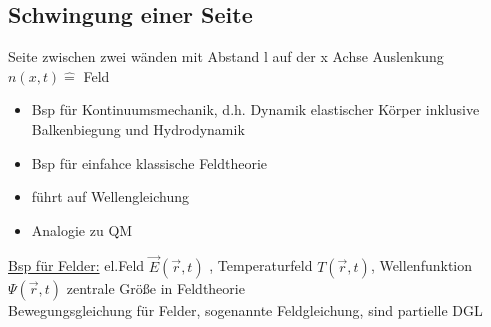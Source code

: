\documentclass[titlepage,12pt,a4paper,ngerman]{report}
\begin{document}
\subsection{Schwingung einer Seite}
Seite zwischen zwei wänden mit Abstand l auf der x Achse
Auslenkung $ n(x,t) \widehat{=} $ Feld
\begin{itemize}
	\item Bsp für Kontinuumsmechanik, d.h. Dynamik elastischer Körper inklusive Balkenbiegung und Hydrodynamik
	\item Bsp für einfahce klassische Feldtheorie
	\item führt auf Wellengleichung
	\item Analogie zu QM
\end{itemize}

\underline{Bsp für Felder:} el.Feld $ \vec{E}(\vec{r},t) $ , Temperaturfeld $ T(\vec{r},t) $, Wellenfunktion $ \Psi(\vec{r},t) $ zentrale Größe in Feldtheorie\\
Bewegungsgleichung für Felder, sogenannte Feldgleichung, sind partielle DGL\\
\end{document}

